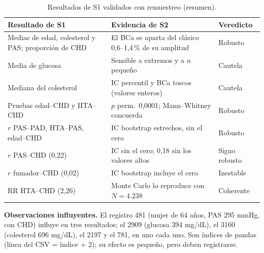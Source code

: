 \documentclass[11pt,a4paper]{article}
\begin{document}
\begin{table}[H]
\centering
\small
\caption{Resultados de S1 validados con remuestreo (resumen).}
\label{tab:val}
\begin{tabular}{>{\raggedright\arraybackslash}p{5.7cm} >{\raggedright\arraybackslash}p{6.5cm} l}
\toprule
\textbf{Resultado de S1} & \textbf{Evidencia de S2} & \textbf{Veredicto} \\
\midrule
Medias de edad, colesterol y PAS; proporción de CHD & El BCa se aparta del clásico 0,6--1,4\,\% de su amplitud & Robusto \\
Media de glucosa & Sensible a extremos y a $n$ pequeño & Cautela \\
Mediana del colesterol & IC percentil y BCa toscos (valores enteros) & Cautela \\
Pruebas edad--CHD y HTA--CHD & $p$ perm.\ 0,0001; Mann--Whitney concuerda & Robusto \\
$r$ PAS--PAD, HTA--PAS, edad--CHD & IC bootstrap estrechos, sin el cero & Robusto \\
$r$ PAS--CHD (0,22) & IC sin el cero; 0,18 sin los valores altos & Signo robusto \\
$r$ fumador--CHD (0,02) & IC bootstrap incluye el cero & Inestable \\
RR HTA--CHD (2,26) & Monte Carlo lo reproduce con $N=4.238$ & Coherente \\
\bottomrule
\end{tabular}
\end{table}

\textbf{Observaciones influyentes.} El registro 481 (mujer de 64 años, PAS 295 mmHg, con CHD) influye en tres resultados; el 2909 (glucosa 394 mg/dL), el 3160 (colesterol 696 mg/dL), el 2197 y el 781, en uno cada uno. Son índices de pandas (línea del CSV = índice + 2); su efecto es pequeño, pero deben registrarse.
\end{document}

